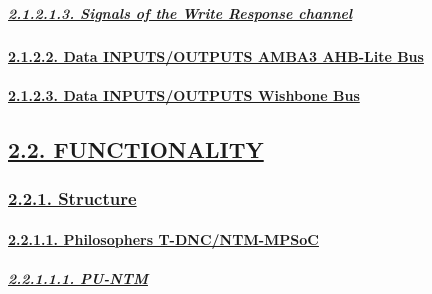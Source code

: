 \documentclass[
]{article}
\begin{document}
\hypertarget{signals-of-the-write-response-channel-1}{%
\subparagraph{\texorpdfstring{\protect\hyperlink{signals-of-the-write-response-channel-3}{2.1.2.1.3.
Signals of the Write Response
channel}}{2.1.2.1.3. Signals of the Write Response channel}}\label{signals-of-the-write-response-channel-1}}

\hypertarget{data-inputsoutputs-amba3-ahb-lite-bus}{%
\paragraph{\texorpdfstring{\protect\hyperlink{data-inputsoutputs-amba3-ahb-lite-bus-1}{2.1.2.2.
Data INPUTS/OUTPUTS AMBA3 AHB-Lite
Bus}}{2.1.2.2. Data INPUTS/OUTPUTS AMBA3 AHB-Lite Bus}}\label{data-inputsoutputs-amba3-ahb-lite-bus}}

\hypertarget{data-inputsoutputs-wishbone-bus}{%
\paragraph{\texorpdfstring{\protect\hyperlink{data-inputsoutputs-wishbone-bus-1}{2.1.2.3.
Data INPUTS/OUTPUTS Wishbone
Bus}}{2.1.2.3. Data INPUTS/OUTPUTS Wishbone Bus}}\label{data-inputsoutputs-wishbone-bus}}

\hypertarget{functionality}{%
\subsection{\texorpdfstring{\protect\hyperlink{functionality-1}{2.2.
FUNCTIONALITY}}{2.2. FUNCTIONALITY}}\label{functionality}}

\hypertarget{structure}{%
\subsubsection{\texorpdfstring{\protect\hyperlink{structure-1}{2.2.1.
Structure}}{2.2.1. Structure}}\label{structure}}

\hypertarget{philosophers-t-dncntm-mpsoc}{%
\paragraph{\texorpdfstring{\protect\hyperlink{philosophers-t-dncntm-mpsoc-1}{2.2.1.1.
Philosophers
T-DNC/NTM-MPSoC}}{2.2.1.1. Philosophers T-DNC/NTM-MPSoC}}\label{philosophers-t-dncntm-mpsoc}}

\hypertarget{pu-ntm}{%
\subparagraph{\texorpdfstring{\protect\hyperlink{pu-ntm-3}{2.2.1.1.1.
PU-NTM}}{2.2.1.1.1. PU-NTM}}\label{pu-ntm}}
\end{document}
